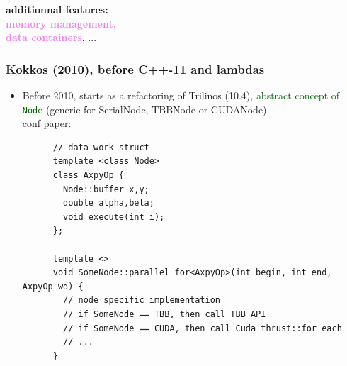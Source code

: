 \begin{frame}
\begin{minipage}{0.26\linewidth}

       {
          \scriptsize
          {\bf additionnal features:}\\
          \textcolor{violet}{\bf memory management,}\\
          \textcolor{violet}{\bf data containers}, ...
       }

  \end{minipage}

\end{frame}

\begin{frame}[fragile=singleslide]
  \frametitle{Kokkos (2010), before C++-11 and lambdas}

  \begin{itemize}
  \item Before 2010, starts as a refactoring of Trilinos (10.4), \textcolor{darkgreen}{abstract concept of {\tt Node}} (generic for SerialNode, TBBNode or CUDANode)\\
    conf paper: 
    {\small
    \begin{verbatim}
      // data-work struct
      template <class Node>
      class AxpyOp {
        Node::buffer x,y;
        double alpha,beta;
        void execute(int i);
      };

      template <>
      void SomeNode::parallel_for<AxpyOp>(int begin, int end, AxpyOp wd) {
        // node specific implementation
        // if SomeNode == TBB, then call TBB API
        // if SomeNode == CUDA, then call Cuda thrust::for_each
        // ...
      }
    \end{verbatim}
  }
  \end{itemize}
\end{frame}


